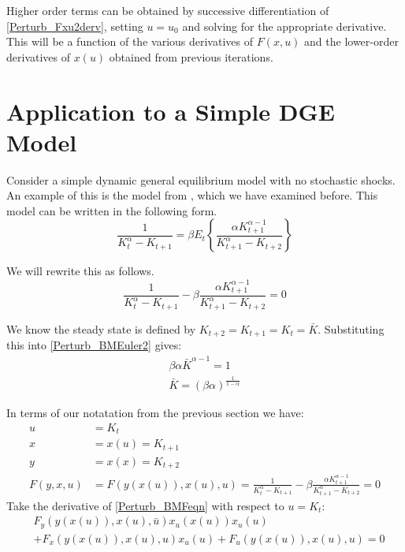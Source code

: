 \documentclass[letterpaper,12pt]{article}
\theoremstyle{definition}
\begin{document}
\begin{spacing}{1.5}
	Higher order terms can be obtained by successive differentiation of \eqref{Perturb_Fxu2derv}, setting $u=u_0$ and solving for the appropriate derivative.  This will be a function of the various derivatives of $F(x,u)$ and the lower-order derivatives of $x(u)$ obtained from previous iterations.

\section{Application to a Simple DGE Model} \label{Perturb_DGE}
	Consider a simple dynamic general equilibrium model with no stochastic shocks.  An example of this is the model from \citet{BrockMirman1972}, which we have examined before.  This model can be written in the following form.
	\begin{equation}\label{Perturb_BMEuler}
		\frac{1}{K_t^\alpha - K_{t+1}} = \beta E_t \left\{\frac{\alpha K_{t+1}^{\alpha-1}}{K_{t+1}^\alpha - K_{t+2}} \right\} \nonumber
	\end{equation}

	We will rewrite this as follows.
	\begin{equation}\label{Perturb_BMEuler2}
		\frac{1}{K_t^\alpha - K_{t+1}} - \beta \frac{\alpha K_{t+1}^{\alpha-1}}{K_{t+1}^\alpha - K_{t+2}} = 0
	\end{equation}	

	We know the steady state is defined by $K_{t+2} = K_{t+1} = K_t = \bar K$.  Substituting this into \eqref{Perturb_BMEuler2} gives:
	\begin{align}
		\beta \alpha {\bar K}^{\alpha-1} = 1 \nonumber \\
		\bar K = (\beta \alpha)^{\frac{1}{1-\alpha}} \label{Perturb_BMSS}
	\end{align}	

	In terms of our notatation from the previous section we have:
	\begin{align}
		u & = K_t \nonumber \\
		x & = x(u) = K_{t+1} \nonumber \\
		y & = x(x) = K_{t+2} \nonumber \\
		F(y,x,u) & = F(y(x(u)),x(u),u) = \frac{1}{K_t^\alpha - K_{t+1}} - \beta \frac{\alpha K_{t+1}^{\alpha-1}}{K_{t+1}^\alpha - K_{t+2}} = 0 \label{Perturb_BMFeqn}
	\end{align}
	Take the derivative of \eqref{Perturb_BMFeqn} with respect to $u = K_t$:
	\begin{equation} \begin{split}
		& F_y(y(x(u)),x(u),\bar u) x_u(x(u)) x_u(u)  \\
		& + F_x(y(x(u)),x(u),u) x_u(u) + F_u(y(x(u)),x(u),u) = 0 \label{Perturb_BMFueqn}
	\end{split} \end{equation}


\end{spacing}
\end{document}
